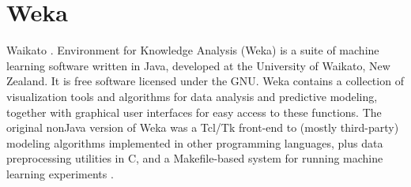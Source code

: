 \section{Weka}

Waikato \cite{ Weka }. Environment for Knowledge Analysis (Weka) is a suite of
machine learning software written in Java, developed at the 
University of Waikato, New Zealand. It is free software licensed under the
 GNU. Weka contains a collection of visualization tools and
algorithms for data analysis and predictive modeling, together with graphical
user interfaces for easy access to these functions.  The original nonJava
version of Weka was a  Tcl/Tk front-end to (mostly third-party)
modeling algorithms implemented in other programming languages, plus data
preprocessing utilities in C, and a Makefile-based system for running machine
learning experiments \cite{ Wiki-Weka }.
